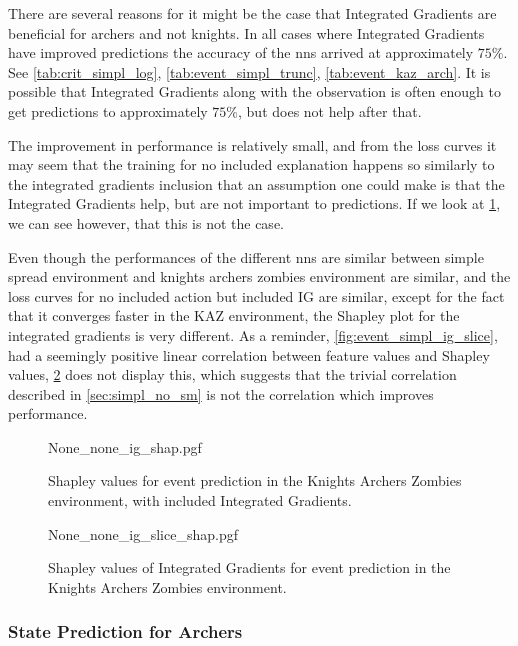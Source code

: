 \documentclass[UKenglish]{uiomasterthesis}
\begin{document}
There are several reasons for it might be the case that Integrated Gradients are beneficial for archers and not knights. In all cases where Integrated Gradients have improved predictions the accuracy of the \acp{nn} arrived at approximately $75\%$. See \cref{tab:crit_simpl_log}, \cref{tab:event_simpl_trunc}, \cref{tab:event_kaz_arch}. It is possible that Integrated Gradients along with the observation is often enough to get predictions to approximately $75\%$, but does not help after that.

The improvement in performance is relatively small, and from the loss curves it may seem that the training for no included explanation happens so similarly to the integrated gradients inclusion that an assumption one could make is that the Integrated Gradients help, but are not important to predictions. If we look at \cref{fig:event_archer_ig_shap}, we can see however, that this is not the case.

Even though the performances of the different \acp{nn} are similar between simple spread environment and knights archers zombies environment are similar, and the loss curves for no included action but included IG are similar, except for the fact that it converges faster in the KAZ environment, the Shapley plot for the integrated gradients is very different. As a reminder, \cref{fig:event_simpl_ig_slice}, had a seemingly positive linear correlation between feature values and Shapley values, \cref{fig:event_archer_ig_slice} does not display this, which suggests that the trivial correlation described in \cref{sec:simpl_no_sm} is not the correlation which improves performance.

\begin{figure}[hbtp]
\centering
{None_none_ig_shap.pgf}
\caption{Shapley values for event prediction in the Knights Archers Zombies environment, with included Integrated Gradients.}
\label{fig:event_archer_ig_shap}
\end{figure}

\begin{figure}[hbtp]
\centering
{None_none_ig_slice_shap.pgf}
\caption{Shapley values of Integrated Gradients for event prediction in the Knights Archers Zombies environment.}
\label{fig:event_archer_ig_slice}
\end{figure}

\subsubsection{State Prediction for Archers}
\end{document}
